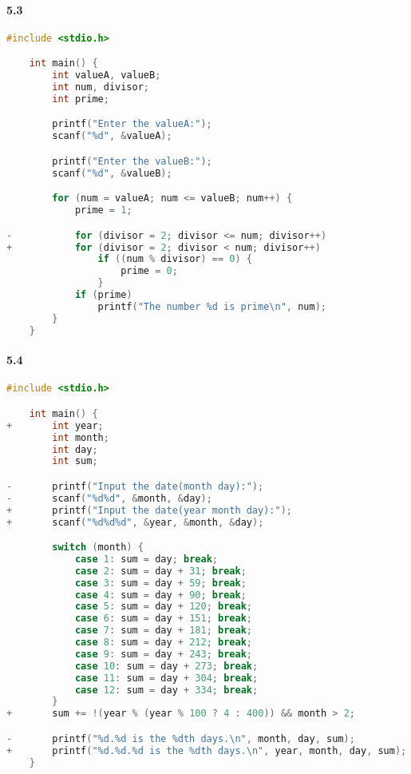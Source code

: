\documentclass[UTF8]{ctexart}
\begin{document}
\paragraph{5.3}
\begin{lstlisting}[language=C]
    #include <stdio.h>

    int main() {
        int valueA, valueB;
        int num, divisor;
        int prime;

        printf("Enter the valueA:");
        scanf("%d", &valueA);

        printf("Enter the valueB:");
        scanf("%d", &valueB);

        for (num = valueA; num <= valueB; num++) {
            prime = 1;

-           for (divisor = 2; divisor <= num; divisor++)
+           for (divisor = 2; divisor < num; divisor++)
                if ((num % divisor) == 0) {
                    prime = 0;
                }
            if (prime)
                printf("The number %d is prime\n", num);
        }
    }
\end{lstlisting}
\paragraph{5.4}
\begin{lstlisting}[language=C]
    #include <stdio.h>

    int main() {
+       int year;
        int month;
        int day;
        int sum;

-       printf("Input the date(month day):");
-       scanf("%d%d", &month, &day);
+       printf("Input the date(year month day):");
+       scanf("%d%d%d", &year, &month, &day);

        switch (month) {
            case 1: sum = day; break;
            case 2: sum = day + 31; break;
            case 3: sum = day + 59; break;
            case 4: sum = day + 90; break;
            case 5: sum = day + 120; break;
            case 6: sum = day + 151; break;
            case 7: sum = day + 181; break;
            case 8: sum = day + 212; break;
            case 9: sum = day + 243; break;
            case 10: sum = day + 273; break;
            case 11: sum = day + 304; break;
            case 12: sum = day + 334; break;
        }
+       sum += !(year % (year % 100 ? 4 : 400)) && month > 2;

-       printf("%d.%d is the %dth days.\n", month, day, sum);
+       printf("%d.%d.%d is the %dth days.\n", year, month, day, sum);
    }
\end{lstlisting}
\end{document}
